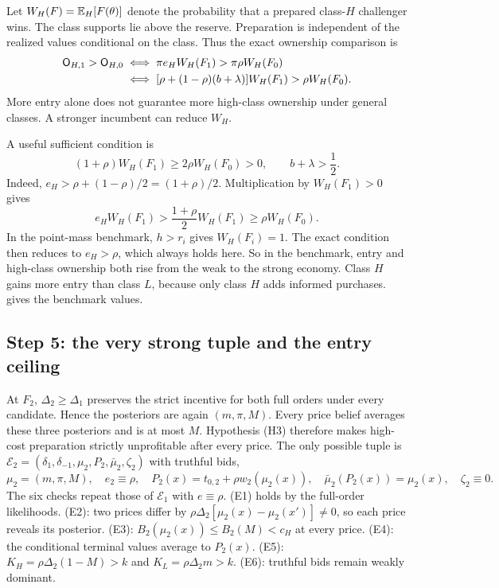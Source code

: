 Let $W_H(F)=\mathbb{E}_H[F(\theta)]$ denote the probability that a prepared class-$H$ challenger wins.
The class supports lie above the reserve.
Preparation is independent of the realized values conditional on the class.
Thus the exact ownership comparison is
\begin{align*}
\mathsf{O}_{H,1}>\mathsf{O}_{H,0}
&\iff \pi e_HW_H(F_1)>\pi\rho W_H(F_0)\\
&\iff [\rho+(1-\rho)(b+\lambda)]W_H(F_1)>\rho W_H(F_0).
\end{align*}
More entry alone does not guarantee more high-class ownership under general classes.
A stronger incumbent can reduce $W_H$.

A useful sufficient condition is
\[
(1+\rho)W_H(F_1)\ge2\rho W_H(F_0)>0,
\qquad b+\lambda>\frac12.
\]
Indeed, $e_H>\rho+(1-\rho)/2=(1+\rho)/2$.
Multiplication by $W_H(F_1)>0$ gives
\[
e_HW_H(F_1)>\frac{1+\rho}{2}W_H(F_1)\ge\rho W_H(F_0).
\]
In the point-mass benchmark, $h>r_i$ gives $W_H(F_i)=1$.
The exact condition then reduces to $e_H>\rho$, which always holds here.
So in the benchmark, entry and high-class ownership both rise from the weak to the strong economy.
Class $H$ gains more entry than class $L$, because only class $H$ adds informed purchases.
 gives the benchmark values.

\subsection{Step 5: the very strong tuple and the entry ceiling}
\label{sec:06_main_result-ceiling}

At $F_2$, $\Delta_2\ge\Delta_1$ preserves the strict incentive for both full orders under every candidate.
Hence the posteriors are again $(m,\pi,M)$.
Every price belief averages these three posteriors and is at most $M$.
Hypothesis (H3) therefore makes high-cost preparation strictly unprofitable after every price.
The only possible tuple is $\mathcal E_2=(\delta_1,\delta_{-1},\mu_2,P_2,\bar\mu_2,\zeta_2)$ with truthful bids,
\[
\mu_2=(m,\pi,M),\quad e_2\equiv\rho,\quad
P_2(x)=t_{0,2}+\rho w_2(\mu_2(x)),\quad
\bar\mu_2(P_2(x))=\mu_2(x),\quad \zeta_2\equiv0.
\]
The six checks repeat those of $\mathcal E_1$ with $e\equiv\rho$.
(E1) holds by the full-order likelihoods.
(E2): two prices differ by $\rho\Delta_2[\mu_2(x)-\mu_2(x')]\neq0$, so each price reveals its posterior.
(E3): $B_2(\mu_2(x))\le B_2(M)<c_H$ at every price.
(E4): the conditional terminal values average to $P_2(x)$.
(E5): $K_H=\rho\Delta_2(1-M)>k$ and $K_L=\rho\Delta_2m>k$.
(E6): truthful bids remain weakly dominant.

